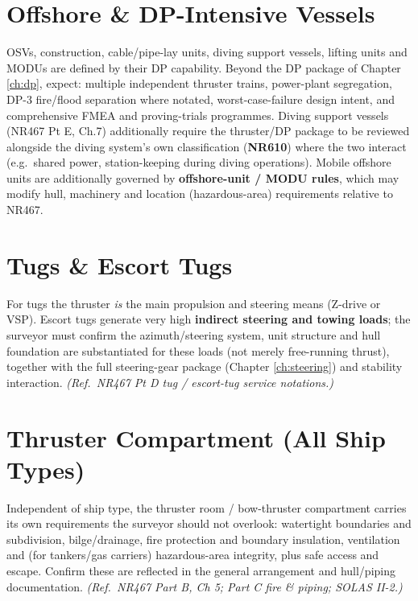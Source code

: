 \documentclass[11pt,a4paper]{report}
\begin{document}
\section{Offshore \& DP-Intensive Vessels}

OSVs, construction, cable/pipe-lay units, diving support vessels, lifting units
and MODUs are defined by their DP capability. Beyond the DP package of Chapter
\ref{ch:dp}, expect: multiple independent thruster trains, power-plant
segregation, DP-3 fire/flood separation where notated, worst-case-failure
design intent, and comprehensive FMEA and proving-trials programmes. Diving
support vessels (NR467 Pt E, Ch.7) additionally require the thruster/DP
package to be reviewed alongside the diving system's own classification
(\textbf{NR610}) where the two interact (e.g.\ shared power, station-keeping
during diving operations). Mobile offshore units are additionally governed by
\textbf{offshore-unit / MODU rules}, which may modify hull, machinery and
location (hazardous-area) requirements relative to NR467.

\section{Tugs \& Escort Tugs}

For tugs the thruster \emph{is} the main propulsion and steering means (Z-drive
or VSP). Escort tugs generate very high \textbf{indirect steering and towing
loads}; the surveyor must confirm the azimuth/steering system, unit structure
and hull foundation are substantiated for these loads (not merely free-running
thrust), together with the full steering-gear package (Chapter \ref{ch:steering})
and stability interaction. \textit{(Ref.\ NR467 Pt D tug / escort-tug service
notations.)}

\section{Thruster Compartment (All Ship Types)}

Independent of ship type, the thruster room / bow-thruster compartment carries
its own requirements the surveyor should not overlook: watertight boundaries and
subdivision, bilge/drainage, fire protection and boundary insulation, ventilation
and (for tankers/gas carriers) hazardous-area integrity, plus safe access and
escape. Confirm these are reflected in the general arrangement and hull/piping
documentation. \textit{(Ref.\ NR467 Part B, Ch 5; Part C fire \& piping;
SOLAS II-2.)}
\end{document}
